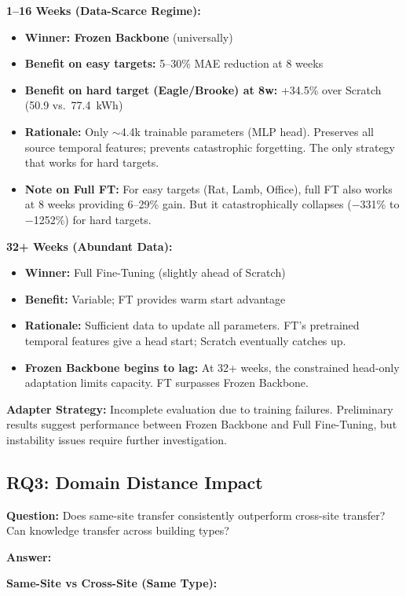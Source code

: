 \documentclass[12pt,a4paper]{report}
\begin{document}
\textbf{1--16 Weeks (Data-Scarce Regime):}
\begin{itemize}
    \item \textbf{Winner: Frozen Backbone} (universally)
    \item \textbf{Benefit on easy targets:} 5--30\% MAE reduction at 8 weeks
    \item \textbf{Benefit on hard target (Eagle/Brooke) at 8w:} +34.5\% over Scratch (50.9 vs.\ 77.4~kWh)
    \item \textbf{Rationale:} Only $\sim$4.4k trainable parameters (MLP head). Preserves all source temporal features; prevents catastrophic forgetting. The only strategy that works for hard targets.
    \item \textbf{Note on Full FT:} For easy targets (Rat, Lamb, Office), full FT also works at 8 weeks providing 6--29\% gain. But it catastrophically collapses ($-$331\% to $-$1252\%) for hard targets.
\end{itemize}

\textbf{32+ Weeks (Abundant Data):}
\begin{itemize}
    \item \textbf{Winner:} Full Fine-Tuning (slightly ahead of Scratch)
    \item \textbf{Benefit:} Variable; FT provides warm start advantage
    \item \textbf{Rationale:} Sufficient data to update all parameters. FT's pretrained temporal features give a head start; Scratch eventually catches up.
    \item \textbf{Frozen Backbone begins to lag:} At 32+ weeks, the constrained head-only adaptation limits capacity. FT surpasses Frozen Backbone.
\end{itemize}

\textbf{Adapter Strategy:} Incomplete evaluation due to training failures. Preliminary results suggest performance between Frozen Backbone and Full Fine-Tuning, but instability issues require further investigation.

\subsection{RQ3: Domain Distance Impact}

\textbf{Question:} Does same-site transfer consistently outperform cross-site transfer? Can knowledge transfer across building types?

\textbf{Answer:}

\textbf{Same-Site vs Cross-Site (Same Type):}
\end{document}
